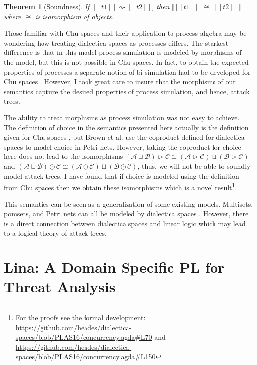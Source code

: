 \documentclass{sigplanconf}
\newcommand{\interp}[1]{\llbracket #1 \rrbracket}
\newcommand{\cat}[1]{\mathcal{#1}}
\newtheorem{theorem}{Theorem}
\begin{document}
\begin{theorem}[Soundness]
  \label{thm:soundness}
  If $[[t1]] \rightsquigarrow [[t2]]$, then $\interp{[[t1]]} \cong
  \interp{[[t2]]}$ where $\cong$ is isomorphism of objects.
\end{theorem}

Those familiar with Chu spaces and their application to process
algebra may be wondering how treating dialectica spaces as processes
differs.  The starkest difference is that in this model process
simulation is modeled by morphisms of the model, but this is not
possible in Chu spaces.  In fact, to obtain the expected properties of
processes a separate notion of bi-simulation had to be developed for
Chu spaces \cite{Gupta:1994}.  However, I took great care to insure
that the morphisms of our semantics capture the desired properties of
process simulation, and hence, attack trees.

The ability to treat morphisms as process simulation was not easy to
achieve.  The definition of choice in the semantics presented here
actually is the definition given for Chu spaces \cite{Gupta:1994}, but
Brown et al. use the coproduct defined for dialectica spaces to model
choice in Petri nets.  However, taking the coproduct for choice here
does not lead to the isomorphisms $(\cat{A} \sqcup \cat{B}) \rhd
\cat{C} \cong (\cat{A} \rhd \cat{C}) \sqcup (\cat{B} \rhd \cat{C})$
and $(\cat{A} \sqcup \cat{B}) \odot \cat{C} \cong (\cat{A} \odot
\cat{C}) \sqcup (\cat{B} \odot \cat{C})$, thus, we will not be able to
soundly model attack trees.  I have found that if choice is modeled
using the definition from Chu spaces \cite{Gupta:1994} then we obtain
these isomorphisms which is a novel result\footnote{For the proofs see
  the formal development:
  \url{https://github.com/heades/dialectica-spaces/blob/PLAS16/concurrency.agda\#L70}
  and
  \url{https://github.com/heades/dialectica-spaces/blob/PLAS16/concurrency.agda\#L150}}.

This semantics can be seen as a generalization of some existing
models.  Multisets, pomsets, and Petri nets can all be modeled by
dialectica spaces \cite{Brown:1991,Gupta:1994}.  However, there is a
direct connection between dialectica spaces and linear logic which
may lead to a logical theory of attack trees.

\section{Lina: A Domain Specific PL for Threat Analysis}
\label{sec:lina:_a_domain_specific_pl_for_threat_analysis}
\end{document}
